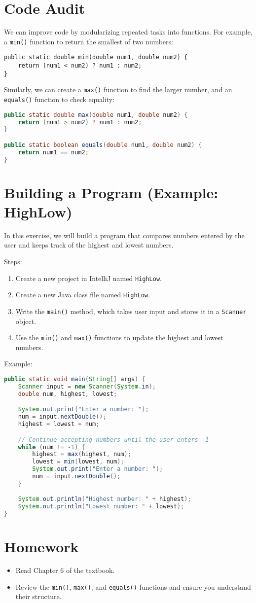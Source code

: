 \documentclass{article}
\begin{document}
\section{Code Audit}
We can improve code by modularizing repeated tasks into functions. For example, a \texttt{min()} function to return the smallest of two numbers:
\begin{lstlisting}
public static double min(double num1, double num2) {
    return (num1 < num2) ? num1 : num2;
}
\end{lstlisting}

Similarly, we can create a \texttt{max()} function to find the larger number, and an \texttt{equals()} function to check equality:
\begin{lstlisting}[language=java]
public static double max(double num1, double num2) {
    return (num1 > num2) ? num1 : num2;
}

public static boolean equals(double num1, double num2) {
    return num1 == num2;
}
\end{lstlisting}

\section{Building a Program (Example: HighLow)}
In this exercise, we will build a program that compares numbers entered by the user and keeps track of the highest and lowest numbers.

Steps:
\begin{enumerate}
    \item Create a new project in IntelliJ named \texttt{HighLow}.
    \item Create a new Java class file named \texttt{HighLow}.
    \item Write the \texttt{main()} method, which takes user input and stores it in a \texttt{Scanner} object.
    \item Use the \texttt{min()} and \texttt{max()} functions to update the highest and lowest numbers.
\end{enumerate}

Example:
\begin{lstlisting}[language=java]
public static void main(String[] args) {
    Scanner input = new Scanner(System.in);
    double num, highest, lowest;

    System.out.print("Enter a number: ");
    num = input.nextDouble();
    highest = lowest = num;

    // Continue accepting numbers until the user enters -1
    while (num != -1) {
        highest = max(highest, num);
        lowest = min(lowest, num);
        System.out.print("Enter a number: ");
        num = input.nextDouble();
    }

    System.out.println("Highest number: " + highest);
    System.out.println("Lowest number: " + lowest);
}
\end{lstlisting}

\section{Homework}
\begin{itemize}
    \item Read Chapter 6 of the textbook.
    \item Review the \texttt{min()}, \texttt{max()}, and \texttt{equals()} functions and ensure you understand their structure.
\end{itemize}
\end{document}
